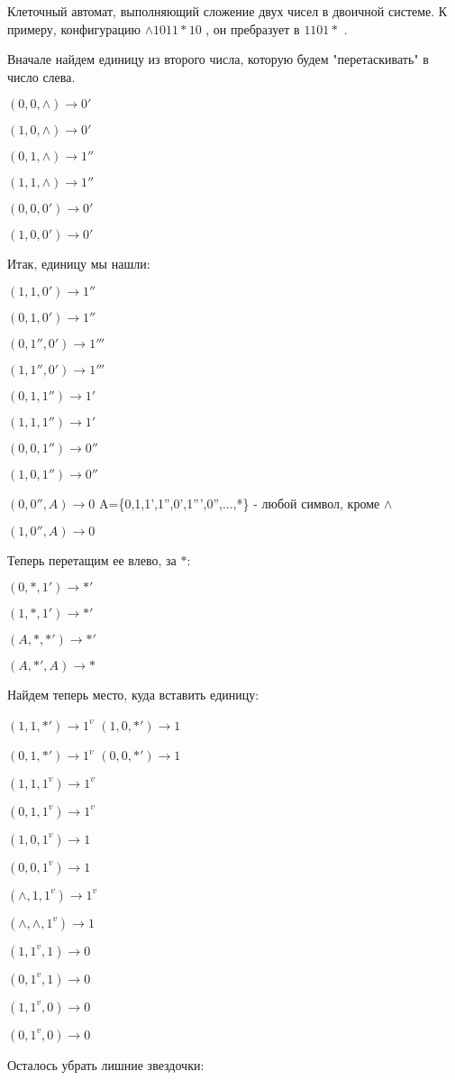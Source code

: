 \documentclass[12pt,a4paper]{article}
\begin{document}
Клеточный автомат, выполняющий сложение двух чисел в двоичной системе. К примеру, конфигурацию  $\wedge1011\ast 10$ , он пребразует в $1101\ast$ .

Вначале найдем единицу из второго числа, которую будем "перетаскивать" в число слева.

$(0,0,\wedge)\to 0'$

$(1,0,\wedge)\to 0'$

$(0,1,\wedge)\to 1''$

$(1,1,\wedge)\to 1''$

$(0,0,0')\to 0'$

$(1,0,0')\to 0'$

Итак, единицу мы нашли:

$(1,1,0')\to 1''$

$(0,1,0')\to 1''$

$(0,1'',0')\to 1'''$

$(1,1'',0')\to 1'''$

$(0,1,1'')\to 1'$

$(1,1,1'')\to 1'$

$(0,0,1'')\to 0''$

$(1,0,1'')\to 0''$

$(0,0'',A)\to 0$  A=\{0,1,1',1'',0',1''',0'',...,*\} - любой символ, кроме $\wedge$

$(1,0'',A)\to 0$

Теперь перетащим ее влево, за $\ast$:

$(0,*,1')\to *'$

$(1,*,1')\to *'$

$(A,*,*')\to *'$

$(A,*',A)\to *$

Найдем теперь место, куда вставить единицу:

$(1,1,*')\to 1^v$
$(1,0,*')\to 1$

$(0,1,*')\to 1^v$
$(0,0,*')\to 1$


$(1,1,1^v)\to 1^v$

$(0,1,1^v)\to 1^v$

$(1,0,1^v)\to 1$

$(0,0,1^v)\to 1$

$(\wedge,1,1^v)\to 1^v$

$(\wedge,\wedge,1^v)\to 1$

$(1,1^v,1)\to 0$

$(0,1^v,1)\to 0$

$(1,1^v,0)\to 0$

$(0,1^v,0)\to 0$

Осталось убрать лишние звездочки:
\end{document}
